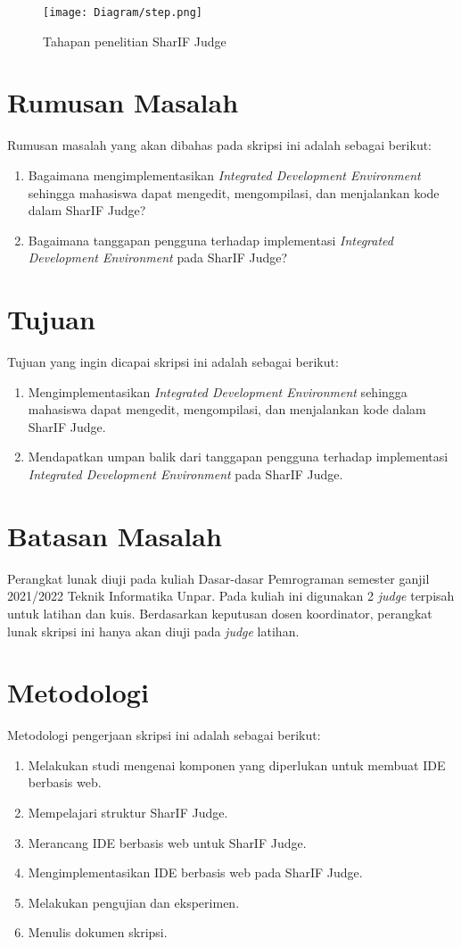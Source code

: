 \begin{figure}[H]
	\centering  
	\texttt{[image: Diagram/step.png]}  
	\caption{Tahapan penelitian SharIF Judge}
	\label{fig:1:step} 
\end{figure} 

\section{Rumusan Masalah}
\label{sec:rumusan}
Rumusan masalah yang akan dibahas pada skripsi ini adalah sebagai berikut:
\begin{enumerate}
	\item Bagaimana mengimplementasikan {\it Integrated Development Environment} sehingga mahasiswa dapat mengedit, mengompilasi, dan menjalankan kode dalam SharIF Judge?
	\item Bagaimana tanggapan pengguna terhadap implementasi {\it Integrated Development Environment} pada SharIF Judge? 
\end{enumerate}


\section{Tujuan}
\label{sec:tujuan}
Tujuan yang ingin dicapai skripsi ini adalah sebagai berikut:
\begin{enumerate}
	\item Mengimplementasikan {\it Integrated Development Environment} sehingga mahasiswa dapat mengedit, mengompilasi, dan menjalankan kode dalam SharIF Judge.
	\item Mendapatkan umpan balik dari tanggapan pengguna terhadap implementasi {\it Integrated Development Environment} pada SharIF Judge.
\end{enumerate}

\section{Batasan Masalah}
\label{sec:batasan}
Perangkat lunak diuji pada kuliah Dasar-dasar Pemrograman semester ganjil 2021/2022 Teknik Informatika Unpar. Pada kuliah ini digunakan 2 \textit{judge} terpisah untuk latihan dan kuis. Berdasarkan keputusan dosen koordinator, perangkat lunak skripsi ini hanya akan diuji pada \textit{judge} latihan.

\section{Metodologi}
\label{sec:metlit}
Metodologi pengerjaan skripsi ini adalah sebagai berikut:
\begin{enumerate}
	\item Melakukan studi mengenai komponen yang diperlukan untuk membuat IDE berbasis web.
	\item Mempelajari struktur SharIF Judge.
	\item Merancang IDE berbasis web untuk SharIF Judge.
	\item Mengimplementasikan IDE berbasis web pada SharIF Judge.
	\item Melakukan pengujian dan eksperimen.
	\item Menulis dokumen skripsi.
\end{enumerate}


